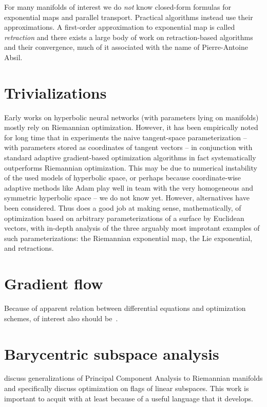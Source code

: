 For many manifolds of interest we do \emph{not} know closed-form formulas for
exponential maps and parallel transport. Practical algorithms instead use their
approximations. A first-order approximation to exponential map is called
\emph{retraction} and there exists a large body of work on retraction-based
algorithms and their convergence, much of it associated with the name of
Pierre-Antoine Absil.

\section*{Trivializations}

Early works on hyperbolic neural networks (with parameters lying on manifolds)
mostly rely on Riemannian optimization. However, it has been empirically noted
for long time that in experiments the naive tangent-space parameterization --
with parameters stored as coordinates of tangent vectors -- in conjunction with
standard adaptive gradient-based optimization algorithms in fact systematically
outperforms Riemannian optimization. This may be due to numerical instability
of the used models of hyperbolic space, or perhaps because coordinate-wise
adaptive methods like Adam play well in team with the very homogeneous and
symmetric hyperbolic space -- we do not know yet. However, alternatives have
been considered. Thus \citet{trivializations} does a good job at making sense,
mathematically, of optimization based on arbitrary parameterizations of a
surface by Euclidean vectors, with in-depth analysis of the three arguably most
improtant examples of such parameterizations: the Riemannian exponential map,
the Lie exponential, and retractions.

\section*{Gradient flow}

Because of apparent relation between differential equations and optimization
schemes, of interest also should
be~\citet{ambrosioGradientFlows,ambrosioOTSummerSchool}.

\section*{Barycentric subspace analysis}

\citet{baryPennec} discuss generalizations of Principal Component Analysis to
Riemannian manifolds and specifically discuss optimization on flags of linear
subspaces. This work is important to acquit with at least because of a useful
language that it develops.
